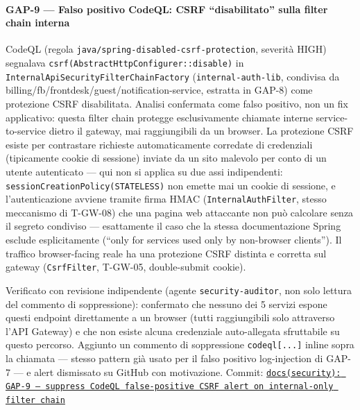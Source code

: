 ﻿\documentclass[a4paper,12pt]{report}
\newcommand{\commitref}[2]{\texttt{\small \href{https://github.com/diegoandruccioli/hotel-pms/commit/#1}{#2}}}
\begin{document}
\paragraph{GAP-9 --- Falso positivo CodeQL: CSRF ``disabilitato'' sulla filter chain interna}
CodeQL (regola \texttt{java/spring-disabled-csrf-protection}, severità HIGH)
segnalava \texttt{csrf(AbstractHttpConfigurer::disable)} in
\texttt{InternalApiSecurityFilterChainFactory} (\texttt{internal-auth-lib},
condivisa da billing/fb/frontdesk/guest/notification-service, estratta in
GAP-8) come protezione CSRF disabilitata. Analisi confermata come falso
positivo, non un fix applicativo: questa filter chain protegge
esclusivamente chiamate interne service-to-service dietro il gateway, mai
raggiungibili da un browser. La protezione CSRF esiste per contrastare
richieste automaticamente corredate di credenziali (tipicamente cookie di
sessione) inviate da un sito malevolo per conto di un utente autenticato ---
qui non si applica su due assi indipendenti: \texttt{sessionCreationPolicy(STATELESS)}
non emette mai un cookie di sessione, e l'autenticazione avviene tramite
firma HMAC (\texttt{InternalAuthFilter}, stesso meccanismo di T-GW-08) che
una pagina web attaccante non può calcolare senza il segreto condiviso ---
esattamente il caso che la stessa documentazione Spring esclude
esplicitamente (``only for services used only by non-browser clients''). Il
traffico browser-facing reale ha una protezione CSRF distinta e corretta sul
gateway (\texttt{CsrfFilter}, T-GW-05, double-submit cookie).

Verificato con revisione indipendente (agente \texttt{security-auditor}, non
solo lettura del commento di soppressione): confermato che nessuno dei 5
servizi espone questi endpoint direttamente a un browser (tutti raggiungibili
solo attraverso l'API Gateway) e che non esiste alcuna credenziale
auto-allegata sfruttabile su questo percorso. Aggiunto un commento di
soppressione \texttt{codeql[...]} inline sopra la chiamata --- stesso pattern
già usato per il falso positivo log-injection di GAP-7 --- e alert dismissato
su GitHub con motivazione.
Commit: \commitref{f8c139a}{docs(security): GAP-9 --- suppress CodeQL false-positive CSRF alert on internal-only filter chain}
\end{document}
